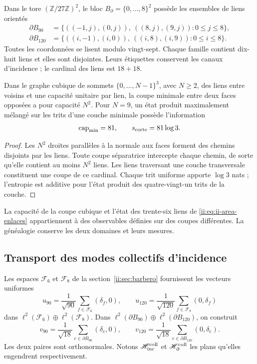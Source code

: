 Dans le tore \((\mathbb Z/27\mathbb Z)^2\), le bloc
\(B_\partial=\{0,\ldots,8\}^2\) possède les ensembles de liens
orientés
\begin{align}
 \partial B_{90}
 &=\{((-1,j),(0,j)),\ ((8,j),(9,j)):0\le j\le8\},\\
 \partial B_{120}
 &=\{((i,-1),(i,0)),\ ((i,8),(i,9)):0\le i\le8\}.
 \label{ii:eq:ii-area-enlaces}
\end{align}
Toutes les coordonnées se lisent modulo vingt-sept. Chaque famille contient
dix-huit liens et elles sont disjointes. Leurs étiquettes conservent les
canaux d'incidence ; le cardinal des liens est \(18+18\).

\begin{theorem}
\label{ii:thm:ii-area-corte-minimo}
Dans le graphe cubique de sommets \(\{0,\ldots,N-1\}^3\), avec
\(N\ge2\), des liens entre voisins et une capacité unitaire par lien,
la coupe minimale entre deux faces opposées a pour capacité \(N^2\).
Pour \(N=9\), un état produit maximalement mélangé sur les
trits d'une couche minimale possède l'information
\begin{equation}
 \operatorname{cap}_{\min}=81,\qquad s_{\rm corte}=81\log3.
 \label{ii:eq:ii-area-corte-informacion}
\end{equation}
\end{theorem}
\begin{proof}
Les \(N^2\) droites parallèles à la normale aux faces forment des chemins
disjoints par les liens. Toute coupe séparatrice intercepte chaque chemin, de
sorte qu'elle contient au moins \(N^2\) liens. Les liens traversant
une couche transversale constituent une coupe de ce cardinal. Chaque trit
uniforme apporte \(\log3\) nats ; l'entropie est additive pour l'état
produit des quatre-vingt-un trits de la couche.
\end{proof}

La capacité de la coupe cubique et l'état des trente-six liens
de \eqref{ii:eq:ii-area-enlaces} appartiennent à des observables définies sur
des coupes différentes. La généalogie conserve les deux domaines et leurs mesures.

\subsection{Transport des modes collectifs d'incidence}
\label{ii:sec:ii-area-transporte-colectivo}

Les espaces \(\mathcal F_6\) et \(\mathcal F_8\) de la
section~\ref{ii:sec:barbero} fournissent les vecteurs uniformes
\[
 u_{90}=\frac1{\sqrt{90}}\sum_{f\in\mathcal F_6}(\delta_f,0),
 \qquad
 u_{120}=\frac1{\sqrt{120}}\sum_{f\in\mathcal F_8}(0,\delta_f)
\]
dans \(\ell^2(\mathcal F_6)\oplus\ell^2(\mathcal F_8)\).
Dans \(\ell^2(\partial B_{90})\oplus\ell^2(\partial B_{120})\),
on construit
\[
 v_{90}=\frac1{\sqrt{18}}\sum_{e\in\partial B_{90}}(\delta_e,0),
 \qquad
 v_{120}=\frac1{\sqrt{18}}\sum_{e\in\partial B_{120}}(0,\delta_e).
\]
Les deux paires sont orthonormales. Notons
\(\mathscr H_{\rm inc}^{\rm coll}\) et
\(\mathscr H_\partial^{\rm coll}\) les plans qu'elles engendrent respectivement.

